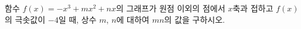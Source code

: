 함수 $f(x)=-x^3+mx^2+nx$의 그래프가 원점 이외의 점에서 $x$축과 접하고 $f(x)$의 극솟값이 $-4$일 때, 상수 $m$, $n$에 대하여 $mn$의 값을 구하시오.
